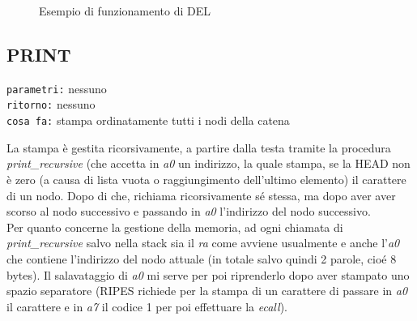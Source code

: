 \documentclass[11pt]{report}
\begin{document}
    \begin{figure}[H]
            \centering
            
            \caption{Esempio di funzionamento di DEL}
            \label{fig}
    \end{figure}


    \subsection{PRINT}
    \begin{mdframed}
        \texttt{parametri:} nessuno \\
         \texttt{ritorno:} nessuno \\
         \texttt{cosa fa:} stampa ordinatamente tutti i nodi della catena
    \end{mdframed}

    La stampa è gestita ricorsivamente, a partire dalla testa tramite la procedura \textit{print\_recursive} (che accetta in \textit{a0} un indirizzo, la quale stampa, se la HEAD non è zero (a causa di lista vuota o raggiungimento dell'ultimo elemento) il carattere di un nodo. Dopo di che, richiama ricorsivamente sé stessa, ma dopo aver aver scorso al nodo successivo e passando in \textit{a0} l'indirizzo del nodo successivo.\\
    Per quanto concerne la gestione della memoria, ad ogni chiamata di \textit{print\_recursive} salvo nella stack sia il \textit{ra} come avviene usualmente e anche l'\textit{a0} che contiene l'indirizzo del nodo attuale (in totale salvo quindi 2 parole, cioé 8 bytes). Il salavataggio di \textit{a0} mi serve per poi riprenderlo dopo aver stampato uno spazio separatore (RIPES richiede per la stampa di un carattere di passare in \textit{a0} il carattere e in \textit{a7} il codice 1 per poi effettuare la \textit{ecall}).
\end{document}
